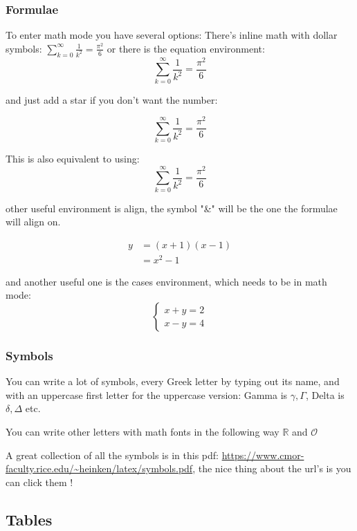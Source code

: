 \documentclass{article}
\begin{document}
\subsubsection{Formulae}
To enter math mode you have several options: There's inline math with dollar symbols: $\sum_{k=0}^\infty \frac{1}{k^2} = \frac{\pi^2}{6}$ or there is the equation environment:
\begin{equation}
    \sum_{k=0}^\infty \frac{1}{k^2} = \frac{\pi^2}{6}
\end{equation}

and just add a star if you don't want the number:

\begin{equation*}
    \sum_{k=0}^\infty \frac{1}{k^2} = \frac{\pi^2}{6}
\end{equation*}

This is also equivalent to using:
\[
    \sum_{k=0}^\infty \frac{1}{k^2} = \frac{\pi^2}{6}
\]

other useful environment is align, the symbol "\&" will be the one the formulae will align on.

\begin{align}
    y &= (x+1)(x-1) \\
    &= x^2 - 1
\end{align}

and another useful one is the cases environment, which needs to be in math mode:
\begin{equation}
    \begin{cases}
        x + y = 2 \\
        x - y = 4
    \end{cases}
\end{equation}

\subsubsection{Symbols}
You can write a lot of symbols, every Greek letter by typing out its name, and with an uppercase first letter for the uppercase version: Gamma is $\gamma, \Gamma$, Delta is $\delta, \Delta$ etc.

You can write other letters with math fonts in the following way $\mathbb{R}$ and $\mathcal{O}$

A great collection of all the symbols is in this pdf: \url{https://www.cmor-faculty.rice.edu/~heinken/latex/symbols.pdf}, the nice thing about the url's is you can click them !

\subsection{Tables}
\end{document}

